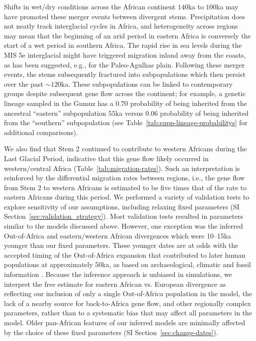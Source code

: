 \documentclass[]{article}
\begin{document}
Shifts in wet/dry conditions across the African continent $140$ka to $100$ka
may have promoted these merger events between divergent stems.  Precipitation
does not neatly track interglacial cycles in Africa, and heterogeneity across
regions may mean that the beginning of an arid period in eastern Africa is
conversely the start of a wet period in southern Africa\citep{Blome2012-lw}.
The rapid rise in sea levels during the MIS 5e interglacial might have
triggered migration inland away from the coasts, as has been suggested, e.g.,
for the Paleo-Agulhas plain\citep{Marean2014-pg}. Following these merger
events, the stems subsequently fractured into subpopulations which then persist
over the past $\sim120$ka. These subpopulations can be linked to contemporary
groups despite subsequent gene flow across the continent; for example, a
genetic lineage sampled in the Gumuz has a $0.70$ probability of being
inherited from the ancestral ``eastern'' subpopulation $55$ka versus $0.06$
probability of being inherited from the ``southern'' subpopulation (see
Table~\ref{tab:supp-lineage-probabilitys} for additional comparisons). 

We also find that Stem 2 continued to contribute to western Africans during the
Last Glacial Period, indicative that this gene flow likely occurred in
western/central Africa (Table~\ref{tab:migration-rates}). Such an
interpretation is reinforced by the differential migration rates between
regions, i.e., the gene flow from Stem 2 to western Africans is estimated to be
five times that of the rate to eastern Africans during this period. We
performed a variety of validation tests to explore sensitivity of our
assumptions, including relaxing fixed parameters (SI
Section~\ref{sec:validation_strategy}). Most validation tests resulted in
parameters similar to the models discussed above.  However, one exception was
the inferred Out-of-Africa and eastern/western African divergences which were
10–15ka younger than our fixed parameters. These younger dates are at odds with
the accepted timing of the Out-of-Africa expansion that contributed to later
human populations at approximately 50ka, as based on archaeological, climatic
and fossil information \citep{Fu2014-am,Groucutt2015-do,
Prufer2021-ao,Beyer2021-ym}. Because the inference approach is unbiased in
simulations, we interpret the free estimate for eastern African vs. European
divergence as reflecting our inclusion of only a single Out-of-Africa
population in the model, the lack of a nearby source for back-to-Africa gene
flow, and other regionally complex parameters, rather than to a systematic bias
that may affect all parameters in the model. Older pan-African features of our
inferred models are minimally affected by the choice of these fixed parameters
(SI Section~\ref{sec:change-dates}).
\end{document}
